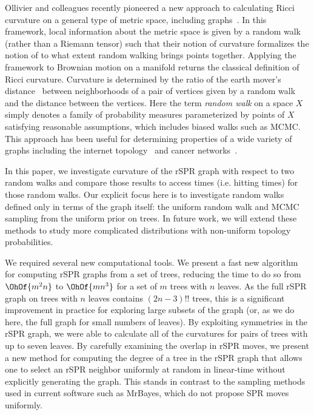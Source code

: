 \documentclass[10pt,twoside,leqno,twocolumn]{article}
\begin{document}
Ollivier and colleagues recently pioneered a new approach to calculating Ricci curvature on a general type of metric space, including graphs~\cite{Ollivier2009-bw,Joulin2010-jg}.
In this framework, local information about the metric space is given by a random walk (rather than a Riemann tensor) such that their notion of curvature formalizes the notion of to what extent random walking brings points together.
Applying the framework to Brownian motion on a manifold returns the classical definition of Ricci curvature.
Curvature is determined by the ratio of the earth mover's distance~\cite{rubner2000earth} between neighborhoods of a pair of vertices given by a random walk and the distance between the vertices.
Here the term \emph{random walk} on a space $X$ simply denotes a family of probability measures parameterized by points of $X$ satisfying reasonable assumptions, which includes biased walks such as MCMC.
This approach has been useful for determining properties of a wide variety of graphs including the internet topology~\cite{ni2015ricci} and cancer networks~\cite{sandhu2015graph}.

In this paper, we investigate curvature of the rSPR graph with respect to two random walks and compare those results to access times (i.e. hitting times) for those random walks.
Our explicit focus here is to investigate random walks defined only in terms of the graph itself: the uniform random walk and MCMC sampling from the uniform prior on trees.
In future work, we will extend these methods to study more complicated distributions with non-uniform topology probabilities.

We required several new computational tools.
We present a fast new algorithm for computing rSPR graphs from a set of trees, reducing the time to do so from $\OhOf{m^2n}$ to $\OhOf{mn^3}$ for a set of $m$ trees with $n$ leaves.
As the full rSPR graph on trees with $n$ leaves contains $(2n-3)!!$ trees, this is a significant improvement in practice for exploring large subsets of the graph (or, as we do here, the full graph for small numbers of leaves).
By exploiting symmetries in the rSPR graph, we were able to calculate all of the curvatures for pairs of trees with up to seven leaves.
By carefully examining the overlap in rSPR moves, we present a new method for computing the degree of a tree in the rSPR graph that allows one to select an rSPR neighbor uniformly at random in linear-time without explicitly generating the graph.
This stands in contrast to the sampling methods used in current software such as MrBayes, which do not propose SPR moves uniformly.
\end{document}
